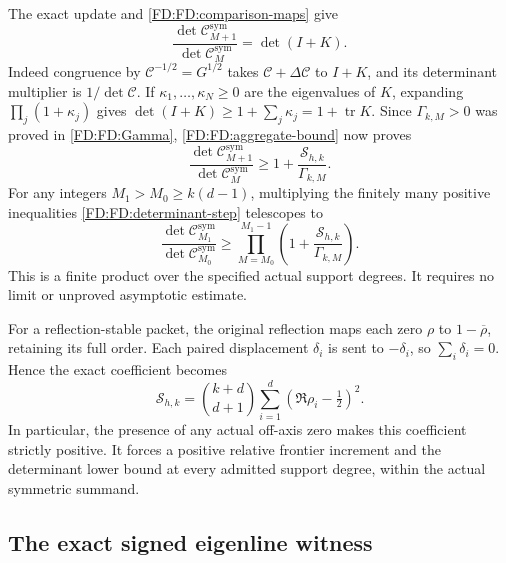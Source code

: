 The exact update and \eqref{FD:FD:comparison-maps} give
\begin{equation}
\frac{\det\mathcal C_{M+1}^{\mathrm{sym}}}
{\det\mathcal C_M^{\mathrm{sym}}}=\det(I+K).
\tag{FD.37}\label{FD:FD:determinant-identity}
\end{equation}
Indeed congruence by \(\mathcal C^{-1/2}=G^{1/2}\) takes
\(\mathcal C+\Delta\mathcal C\) to \(I+K\), and its determinant
multiplier is \(1/\det\mathcal C\).  If
\(\kappa_1,\ldots,\kappa_N\ge0\) are the eigenvalues of \(K\),
expanding \(\prod_j(1+\kappa_j)\) gives
\(\det(I+K)\ge1+\sum_j\kappa_j=1+\operatorname{tr}K\).
Since \(\Gamma_{k,M}>0\) was proved in \eqref{FD:FD:Gamma},
\eqref{FD:FD:aggregate-bound} now proves
\begin{equation}
\boxed{\frac{\det\mathcal C_{M+1}^{\mathrm{sym}}}
{\det\mathcal C_M^{\mathrm{sym}}}
\ge1+\frac{\mathcal S_{h,k}}{\Gamma_{k,M}}.}
\tag{FD.38}\label{FD:FD:determinant-step}
\end{equation}
For any integers \(M_1>M_0\ge k(d-1)\), multiplying the finitely many
positive inequalities \eqref{FD:FD:determinant-step} telescopes to
\begin{equation}
\boxed{\frac{\det\mathcal C_{M_1}^{\mathrm{sym}}}
{\det\mathcal C_{M_0}^{\mathrm{sym}}}
\ge\prod_{M=M_0}^{M_1-1}
\left(1+\frac{\mathcal S_{h,k}}{\Gamma_{k,M}}\right).}
\tag{FD.39}\label{FD:FD:determinant-product}
\end{equation}
This is a finite product over the specified actual support degrees.
It requires no limit or unproved asymptotic estimate.

For a reflection-stable packet, the original reflection maps each zero
\(\rho\) to \(1-\overline\rho\), retaining its full order.  Each
paired displacement \(\delta_i\) is sent to \(-\delta_i\), so
\(\sum_i\delta_i=0\).  Hence the exact coefficient becomes
\begin{equation}
\boxed{\mathcal S_{h,k}=\binom{k+d}{d+1}
\sum_{i=1}^d(\Re\rho_i-\tfrac12)^2.}
\tag{FD.40}\label{FD:FD:reflection-coefficient}
\end{equation}
In particular, the presence of any actual off-axis zero makes this
coefficient strictly positive.  It forces a positive relative frontier
increment and the determinant lower bound at every admitted support
degree, within the actual symmetric summand.

\subsection{The exact signed eigenline witness}

